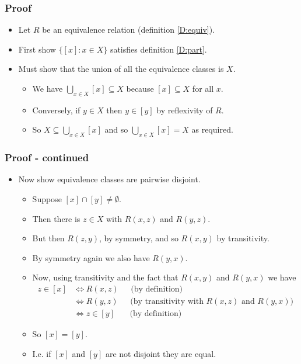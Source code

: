 \documentclass[handout]{beamer}
\begin{document}
\begin{frame}
\frametitle{Proof}
\begin{itemize}
\item Let $R$ be an equivalence relation (definition \ref{D:equiv}).
\vspace{0.3cm}
\item First show $\{[x]:x\in X\}$ satisfies definition \ref{D:part}.
\vspace{0.3cm}
\item Must show that the union of all the equivalence classes is $X$. 
\vspace{0.3cm}
\begin{itemize}
\item We have $\bigcup_{x\in X} [x] \subseteq X$ because $[x]\subseteq X$ for all $x$. 
\vspace{0.3cm}
\item Conversely, if $y\in X$ then $y\in [y]$ by reflexivity of $R$. 
\vspace{0.3cm}
\item So $X\subseteq \bigcup_{x\in X} [x]$ and so $\bigcup_{x\in X} [x]= X$ as required. 
\end{itemize} 
\end{itemize}
\end{frame}

\begin{frame}
\frametitle{Proof - continued}
\begin{itemize}
\item Now show equivalence classes are pairwise disjoint.
\vspace{0.2cm}
\begin{itemize}
\item Suppose $[x]\cap [y] \neq\emptyset$. 
\vspace{0.2cm}
\item Then there is $z\in X$ with $R(x,z)$ and $R(y,z)$. 
\vspace{0.2cm}
\item But then $R(z,y)$, by symmetry, and so $R(x,y)$ by transitivity.  
\vspace{0.2cm}
\item By symmetry again we also have $R(y,x)$. 
\vspace{0.2cm}
\item Now, using transitivity and the fact that $R(x,y)$ and $R(y,x)$ we have 
\vspace{0.2cm}
\begin{align*}
z\in [x] &\iff R(x,z) \phantom{xx}\text{ (by definition)}\\
&\iff R(y,z) \phantom{xx}\text{ (by transitivity with $R(x,z)$ and $R(y,x)$)}\\
&\iff z\in [y] \phantom{xxi}\text{ (by definition)}
\end{align*} 
 \item So $[x]=[y]$.
\vspace{0.2cm}
\item I.e. if $[x]$ and $[y]$ are not disjoint they are equal.

\end{itemize} 
\end{itemize}
\end{frame}
\end{document}
